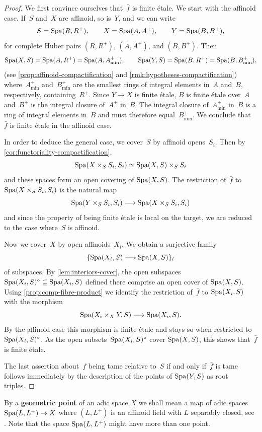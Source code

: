 \begin{proof}
We first convince ourselves that~$\bar{f}$ is finite étale.
We start with the affinoid case.
If~$S$ and~$X$ are affinoid, so is~$Y$, and we can write
\[
 S = \operatorname{Spa}(R,R^+), \qquad X = \operatorname{Spa}(A,A^+), \qquad Y = \operatorname{Spa}(B,B^+),
\]
for complete Huber pairs $(R,R^+)$, $(A,A^+)$, and $(B,B^+)$.
Then
\[
 \operatorname{Spa}(X,S) = \operatorname{Spa}(A,R^+) = \operatorname{Spa}(A,A^+_{\min}), \qquad \operatorname{Spa}(Y,S) = \operatorname{Spa}(B,R^+) = \operatorname{Spa}(B,B^+_{\min}),
\]
(see \cref{prop:affinoid-compactification} and \cref{rmk:hypotheses-compactification}) where~$A^+_{\min}$ and~$B^+_{\min}$ are the smallest rings of integral elements in~$A$ and~$B$, respectively, containing~$R^+$.
Since $Y \to X$ is finite étale, $B$ is finite étale over~$A$ and~$B^+$ is the integral closure of~$A^+$ in~$B$.
The integral closure of~$A^+_{\min}$ in~$B$ is a ring of integral elements in~$B$ and must therefore equal~$B^+_{\min}$.
We conclude that~$\bar{f}$ is finite étale in the affinoid case.

In order to deduce the general case, we cover~$S$ by affinoid opens~$S_i$.
Then by \cref{cor:functoriality-compactification}, 
\[
 \operatorname{Spa}(X \times_S S_i,S_i) \simeq \operatorname{Spa}(X,S) \times_S S_i
\]
and these spaces form an open covering of $\operatorname{Spa}(X,S)$.
The restriction of~$\bar{f}$ to $\operatorname{Spa}(X \times_S S_i,S_i)$ is the natural map
\[
 \operatorname{Spa}(Y \times_S S_i,S_i) \longrightarrow \operatorname{Spa}(X \times_S S_i,S_i)
\]
and since the property of being finite étale is local on the target, we are reduced to the case where~$S$ is affinoid.

Now we cover~$X$ by open affinoids~$X_i$.
We obtain a surjective family
\[
 \{\operatorname{Spa}(X_i,S) \longrightarrow \operatorname{Spa}(X,S)\}_i
\]
of subspaces.
By \cref{lem:interiors-cover}, the open subspaces $\operatorname{Spa}(X_i,S)^\circ \subseteq \operatorname{Spa}(X_i,S)$ defined there comprise an open cover of $\operatorname{Spa}(X,S)$.
Using \cref{prop:comp-fibre-product} we identify the restriction of~$\bar{f}$ to $\operatorname{Spa}(X_i,S)$ with the morphism
\[
 \operatorname{Spa}(X_i \times_X Y,S) \longrightarrow \operatorname{Spa}(X_i,S).
\]
By the affinoid case this morphism is finite étale and stays so when restricted to~$\operatorname{Spa}(X_i,S)^\circ$.
As the open subsets~$\operatorname{Spa}(X_i,S)^\circ$ cover $\operatorname{Spa}(X,S)$, this shows that~$\bar{f}$ is finite étale.

The last assertion about~$f$ being tame relative to~$S$ if and only if~$\bar{f}$ is tame follows immediately by the description of the points of $\operatorname{Spa}(Y,S)$ as root triples.
\end{proof}

By a {\bf geometric point} of an adic space $X$ we shall mean a map of adic spaces $\operatorname{Spa}(L,L^+)\to X$ where $(L, L^+)$ is an affinoid field with $L$ separably closed, see \cite[\S 3.2]{AchingerLaraYoucis2023:GeometricArcsFundamental}. Note that the space $\operatorname{Spa}(L, L^+)$ might have more than one point.

